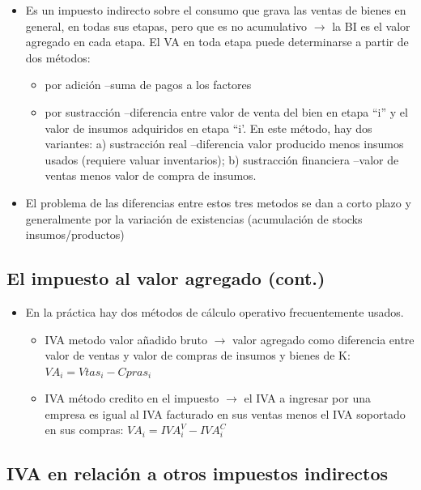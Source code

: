 \documentclass[
  letterpaper,
  DIV=11,
  numbers=noendperiod]{scrartcl}
\begin{document}
\begin{itemize}
\item
  Es un impuesto indirecto sobre el consumo que grava las ventas de
  bienes en general, en todas sus etapas, pero que es no acumulativo
  \(\longrightarrow\) la BI es el valor agregado en cada etapa. El VA en
  toda etapa puede determinarse a partir de dos métodos:

  \begin{itemize}
  \item
    por adición --suma de pagos a los factores
  \item
    por sustracción --diferencia entre valor de venta del bien en etapa
    ``i'' y el valor de insumos adquiridos en etapa ``i'. En este
    método, hay dos variantes: a) sustracción real --diferencia valor
    producido menos insumos usados (requiere valuar inventarios); b)
    sustracción financiera --valor de ventas menos valor de compra de
    insumos.
  \end{itemize}
\item
  El problema de las diferencias entre estos tres metodos se dan a corto
  plazo y generalmente por la variación de existencias (acumulación de
  stocks insumos/productos)
\end{itemize}

\subsection{El impuesto al valor agregado
(cont.)}\label{el-impuesto-al-valor-agregado-cont.}

\begin{itemize}
\item
  En la práctica hay dos métodos de cálculo operativo frecuentemente
  usados.

  \begin{itemize}
  \item
    IVA metodo valor añadido bruto \(\longrightarrow\) valor agregado
    como diferencia entre valor de ventas y valor de compras de insumos
    y bienes de K: \(VA_i=Vtas_{i}-Cpras_{i}\)
  \item
    IVA método credito en el impuesto \(\longrightarrow\) el IVA a
    ingresar por una empresa es igual al IVA facturado en sus ventas
    menos el IVA soportado en sus compras: \(VA_i=IVA_i^V-IVA_i^C\)
  \end{itemize}
\end{itemize}

\subsection{IVA en relación a otros impuestos
indirectos}\label{iva-en-relaciuxf3n-a-otros-impuestos-indirectos}
\end{document}
